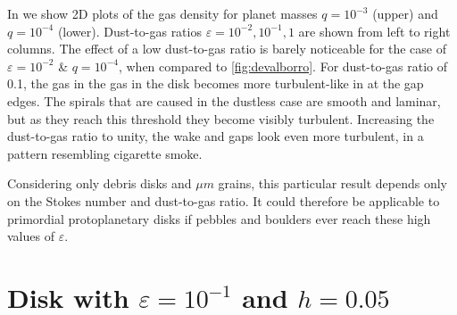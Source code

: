 \documentclass[onecolumn]{report}
\newcommand{\epsi}{\varepsilon}
\begin{document}
In  we show 2D plots of the gas density for planet masses $q=10^{-3}$ (upper) and $q=10^{-4}$ (lower). Dust-to-gas ratios $\varepsilon=10^{-2}, 10^{-1}, 1$ are shown from left to right columns. The effect of a low dust-to-gas ratio is barely noticeable for the case of $\varepsilon=10^{-2}$ \& $q=10^{-4}$, when compared to \ref{fig:devalborro}. For dust-to-gas ratio of 0.1, the gas in the gas in the disk becomes more turbulent-like in at the gap edges. The spirals that are caused in the dustless case are smooth and laminar, but as they reach this threshold they become visibly turbulent. Increasing the dust-to-gas ratio to unity, the wake and gaps look even more turbulent, in a pattern resembling cigarette smoke.

Considering only debris disks and $\mu m$ grains, this particular result depends only on the Stokes number and dust-to-gas ratio. It could therefore be applicable to primordial protoplanetary disks if pebbles and boulders ever reach these high values of $\epsi$.

\section{Disk with $\epsi=10^{-1}$ and $h=0.05$}
\end{document}
